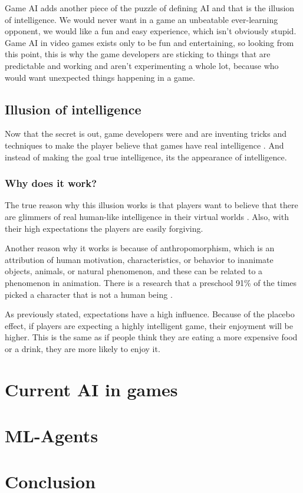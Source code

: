 \documentclass[a4paper, 12pt]{book}
\begin{document}
Game AI adds another piece of the puzzle of defining AI and that is the illusion of intelligence. We would never want in a game an unbeatable ever-learning opponent, we would like a fun and easy experience, which isn't obviously stupid. Game AI in video games exists only to be fun and entertaining, so looking from this point, this is why the game developers are sticking to things that are predictable and working and aren't experimenting a whole lot, because who would want unexpected things happening in a game.

\section{Illusion of intelligence}
Now that the secret is out, game developers were and are inventing tricks and techniques to make the player believe that games have real intelligence \cite{IllusionOfIntelligece}. And instead of making the goal true intelligence, its the appearance of intelligence.

\subsection{Why does it work?}
The true reason why this illusion works is that players want to believe that there are glimmers of real human-like intelligence in their virtual worlds \cite{IllusionOfIntelligece}. Also, with their high expectations the players are easily forgiving.

Another reason why it works is because of anthropomorphism, which is an attribution of human motivation, characteristics, or behavior to inanimate objects, animals, or natural phenomenon, and these can be related to a phenomenon in animation. There is a research that a preschool 91\% of the times picked a character that is not a human being \cite{AnthropomorphicCharacters}.

As previously stated, expectations have a high influence. Because of the placebo effect, if players are expecting a highly intelligent game, their enjoyment will be higher. This is the same as if people think they are eating a more expensive food or a drink, they are more likely to enjoy it.

\chapter{Current AI in games}
\label{ch2}


\chapter{ML-Agents}
\label{ch3}


\chapter{Conclusion}
\label{ch4}



\cleardoublepage
{}


\end{document}
